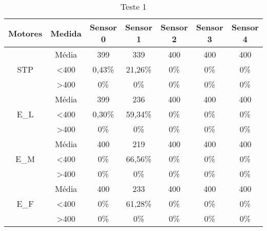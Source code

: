 \begin{table}[]
\centering
\caption{Teste 1}
\label{teste_1}
\begin{tabular}{|c|c|ccccc|}
\hline
\textbf{Motores}                & \textbf{Medida}  & \textbf{Sensor 0} & \textbf{Sensor 1} & \textbf{Sensor 2} & \textbf{Sensor 3} & \textbf{Sensor 4} \\ \hline
\multirow{3}{*}{STP}            & Média            & 399               & 339               & 400               & 400               & 400               \\
                                & \textless 400    & 0,43\%            & 21,26\%           & 0\%            & 0\%            & 0\%            \\
                                & \textgreater 400 & 0\%            & 0\%            & 0\%            & 0\%            & 0\%            \\ \hline
\multirow{3}{*}{E\_L}           & Média            & 399               & 236               & 400               & 400               & 400               \\
                                & \textless 400    & 0,30\%            & 59,34\%           & 0\%            & 0\%            & 0\%            \\
                                & \textgreater 400 & 0\%            & 0\%            & 0\%            & 0\%            & 0\%            \\ \hline
\multirow{3}{*}{E\_M}           & Média            & 400               & 219               & 400               & 400               & 400               \\
                                & \textless 400    & 0\%            & 66,56\%           & 0\%            & 0\%            & 0\%            \\
                                & \textgreater 400 & 0\%            & 0\%            & 0\%            & 0\%            & 0\%            \\ \hline
\multirow{3}{*}{E\_F}           & Média            & 400               & 233               & 400               & 400               & 400               \\
                                & \textless 400    & 0\%            & 61,28\%           & 0\%            & 0\%            & 0\%            \\
                                & \textgreater 400 & 0\%            & 0\%            & 0\%            & 0\%            & 0\%            \\ \hline

\end{tabular}
\end{table}
